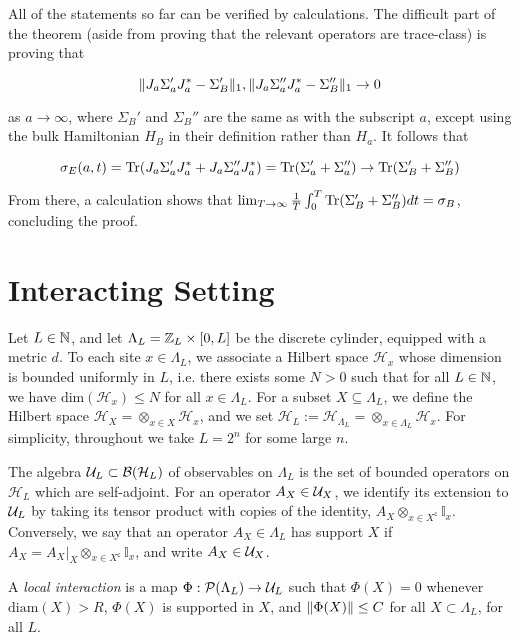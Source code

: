 \documentclass[12pt, letterpaper]{article}
\begin{document}
All of the statements so far can be verified by calculations. The difficult part of the theorem (aside from proving that the relevant operators are trace-class) is proving that

\[\lVert J_a\Sigma_a'J_a^* - \Sigma_B' \rVert_1, \lVert J_a\Sigma_a''J_a^* - \Sigma_B'' \rVert_1 \to 0\]

as $a\to\infty$, where $\Sigma_B'$ and $\Sigma_B''$ are the same as with the subscript $a$, except using the bulk Hamiltonian $H_B$ in their definition rather than $H_a$. It follows that 

\[\sigma_E(a,t) = \text{Tr}(J_a\Sigma_a'J_a^*+J_a\Sigma_a''J_a^*) = \text{Tr}(\Sigma_a'+\Sigma_a'') \to \text{Tr}(\Sigma_B'+\Sigma_B'')\]

From there, a calculation shows that $\lim_{T\to\infty}\frac{1}{T}\int_0^T\text{Tr}(\Sigma_B'+\Sigma_B'')dt = \sigma_B$, concluding the proof.

\section{Interacting Setting}

Let $L\in\mathbb{N}$, and let $\Lambda_L = \mathbb{Z}_L \times [0,L]$ be the discrete cylinder, equipped with a metric $d$. To each site $x \in \Lambda_L$, we associate a Hilbert space $\mathcal{H}_x$ whose dimension is bounded uniformly in $L$, i.e. there exists some $N>0$ such that for all $L \in \mathbb{N}$, we have $\text{dim}(\mathcal{H}_x) \leq N$ for all $x \in \Lambda_L$. For a subset $X \subseteq \Lambda_L$, we define the Hilbert space $\mathcal{H}_X = \otimes_{x \in X} \mathcal{H}_x$, and we set $\mathcal{H}_L := \mathcal{H}_{\Lambda_L} = \otimes_{x \in \Lambda_L}\mathcal{H}_x$. For simplicity, throughout we take $L = 2^n$ for some large $n$.

The algebra $\mathcal{U}_L \subset \mathcal{B}(\mathcal{H}_L)$ of observables on $\Lambda_L$ is the set of bounded operators on $\mathcal{H}_L$ which are self-adjoint. For an operator $A_X \in \mathcal{U}_X$, we identify its extension to $\mathcal{U}_L$ by taking its tensor product with copies of the identity, $A_X \otimes_{x \in X^\mathsf{c}} \mathbb{I}_x$. Conversely, we say that an operator $A_X \in \Lambda_L$ has support $X$ if $A_X = A_X|_{X} \otimes_{x \in X^\mathsf{c}} \mathbb{I}_x$, and write $A_X \in \mathcal{U}_X$.

A \textit{local interaction} is a map $\Phi : \mathcal{P}(\Lambda_L) \to \mathcal{U}_L$ such that $\Phi(X) = 0$ whenever $\text{diam}(X) > R$, $\Phi(X)$ is supported in $X$, and $\lVert \Phi(X) \rVert \leq C$ for all $X \subset \Lambda_L$, for all $L$.
\end{document}
